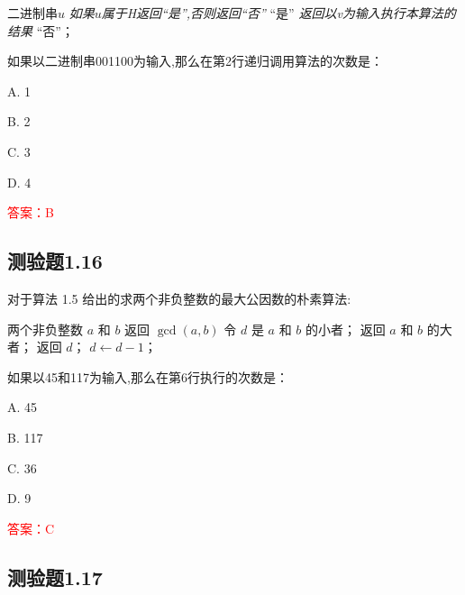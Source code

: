 \documentclass[UTF8, heading=true]{ctexart}
\begin{document}
\begin{algorithm}
    \caption{\textbf{判断一个二进制传是否属于例子1.9定义的集合}}
    \begin{algorithmic}[1]
        \Require 二进制串$u$
        \Ensure \textit{如果$u$属于H返回“是”,否则返回“否”}
        \State \Return “是”
        \EndIf
        \State \textit{返回以v为输入执行本算法的结果}
        \Else 
        \State \Return “否”；
        \EndIf
    \end{algorithmic}
\end{algorithm}

如果以二进制串001100为输入,那么在第2行递归调用算法的次数是：

A. 1

B. 2

C. 3

D. 4

\textcolor{red}{答案：B}

\subsection{测验题1.16}

对于算法 1.5 给出的求两个非负整数的最大公因数的朴素算法:

\begin{algorithm}
  \caption{\textbf{计算两个非负整数的最大公因数 $\operatorname{gcd}(-,-)$ 的朴素算法}}
  \begin{algorithmic}[1]
    \Require 两个非负整数 $a$ 和 $b$
    \Ensure 返回 $\operatorname{gcd}(a, b)$
    \State 令 $d$ 是 $a$ 和 $b$ 的小者；
    \State 返回 $a$ 和 $b$ 的大者；
    \EndIf
    \State 返回 $d$；
    \EndIf
    \State $d \gets d-1$；
    \EndWhile
  \end{algorithmic}
\end{algorithm}

如果以45和117为输入,那么在第6行执行的次数是：

A. 45

B. 117

C. 36

D. 9




\textcolor{red}{答案：C}

\subsection{测验题1.17}
\end{document}
